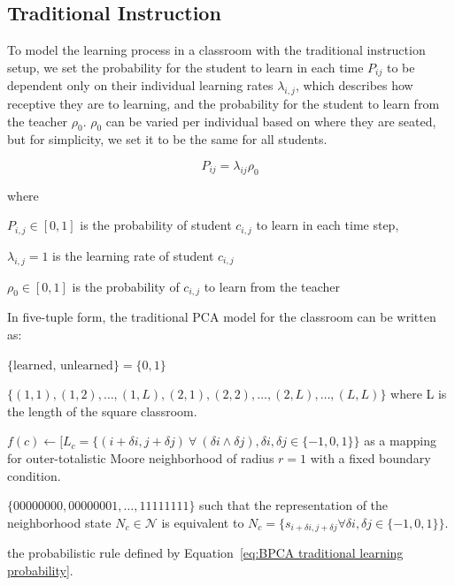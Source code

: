 \subsection{Traditional Instruction}
To model the learning process in a classroom with the traditional instruction setup, we set the probability for the student to learn in each time $P_{ij}$ to be dependent only on their individual learning rates $\lambda_{i,j}$, which describes how receptive they are to learning, and the probability for the student to learn from the teacher $\rho_0$. $\rho_0$ can be varied per individual based on where they are seated, but for simplicity, we set it to be the same for all students.

\begin{equation}
    \label{eq:BPCA traditional learning probability}
        P_{ij} = \lambda_{ij} \rho_{0}
\end{equation}

where

$P_{i,j} \in [0,1]$ is the probability of student $c_{i,j}$ to learn in each time step, 

$\lambda_{i,j} = 1$ is the learning rate of student $c_{i,j}$

$\rho_{0} \in [0,1]$ is the probability of $c_{i,j}$ to learn from the teacher

In five-tuple form, the traditional PCA model for the classroom can be written as:

\begin{CAdef}
\itemS $\lbrace \text{learned, unlearned} \rbrace = \lbrace 0, 1 \rbrace$

\itemC $\lbrace (1,1), (1,2), \dots, (1,L), (2, 1), (2,2), \dots, (2,L), \dots, (L,L)\rbrace$ where L is the length of the square classroom.

\itemL $f(c) \leftarrow \lbrack L_c = \lbrace (i+\delta i,j+\delta j) ~\forall~ (\delta i \land \delta j),  \delta i, \delta j \in \lbrace -1,0,1 \rbrace \rbrace $ as a mapping for outer-totalistic Moore neighborhood of radius $r=1$ with a fixed boundary condition.

\itemN $\lbrace 00000000, 00000001, \dots, 11111111 \rbrace$ such that the representation of the neighborhood state $N_c \in \mathcal{N}$ is equivalent to $N_c = \lbrace s_{i+\delta i, j+\delta j} \forall \delta i, \delta j \in \lbrace -1,0,1 \rbrace \rbrace$.

\itemR the probabilistic rule defined by Equation~\ref{eq:BPCA traditional learning probability}.
\end{CAdef}

